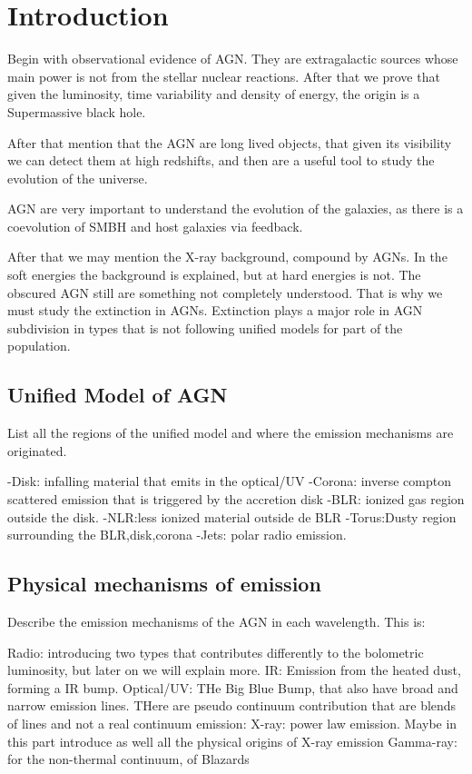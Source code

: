 
\chapter{Introduction}
\label{chap:intro}

Begin with observational evidence of AGN. They are extragalactic sources whose main power is not from the stellar nuclear reactions. After that we prove that given the luminosity, time variability and density of energy, the origin is a Supermassive black hole.

After that mention that the AGN are long lived objects, that given its visibility we can detect them at high redshifts, and then are a useful tool to study the evolution of the universe.

AGN are very important to understand the evolution of the galaxies, as there is a coevolution of SMBH and host galaxies via feedback.

After that we may mention the X-ray background, compound by AGNs. In the soft energies the background is explained, but at hard energies is not. The obscured AGN still are something not completely understood. That is why we must study the extinction in AGNs. Extinction plays a major role in AGN subdivision in types that is not following unified models for part of the population.


\section{Unified Model of AGN}
\label{sec1:um}

List all the regions of the unified model and where the emission mechanisms are originated.

-Disk: infalling material that emits in the optical/UV
-Corona: inverse compton scattered emission that is triggered by the accretion disk
-BLR: ionized gas region outside the disk.
-NLR:less ionized material outside de BLR
-Torus:Dusty region surrounding the BLR,disk,corona
-Jets: polar radio emission.


\section{Physical mechanisms of emission}
\label{sec1:agn}
Describe the emission mechanisms of the AGN in each wavelength. This is:

Radio: introducing two types that contributes differently to the bolometric luminosity, but later on we will explain more.
IR: Emission from the heated dust, forming a IR bump.
Optical/UV: THe Big Blue Bump, that also have broad and narrow emission lines. THere are pseudo continuum contribution that are blends of lines and not a real continuum emission:
X-ray: power law emission. Maybe in this part introduce as well all the physical origins of X-ray emission
Gamma-ray: for the non-thermal continuum, of Blazards

